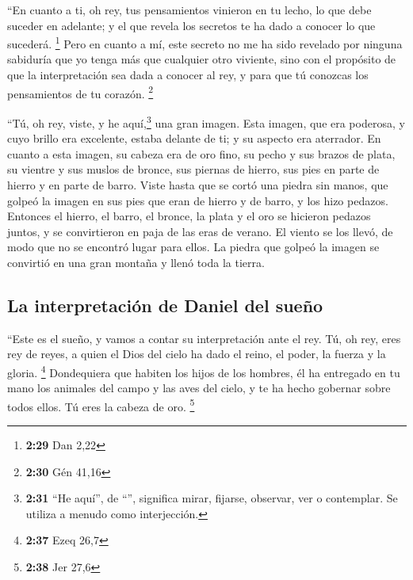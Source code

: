  ``En cuanto a ti, oh rey, tus pensamientos vinieron en
tu lecho, lo que debe suceder en adelante; y el que revela los secretos
te ha dado a conocer lo que sucederá. \footnote{\textbf{2:29} Dan 2,22}
 Pero en cuanto a mí, este secreto no me ha sido revelado
por ninguna sabiduría que yo tenga más que cualquier otro viviente, sino
con el propósito de que la interpretación sea dada a conocer al rey, y
para que tú conozcas los pensamientos de tu corazón. \footnote{\textbf{2:30}
  Gén 41,16}

 ``Tú, oh rey, viste, y he aquí,\footnote{\textbf{2:31}
  ``He aquí'', de ``'', significa mirar, fijarse, observar,
  ver o contemplar. Se utiliza a menudo como interjección.} una gran
imagen. Esta imagen, que era poderosa, y cuyo brillo era excelente,
estaba delante de ti; y su aspecto era aterrador.  En
cuanto a esta imagen, su cabeza era de oro fino, su pecho y sus brazos
de plata, su vientre y sus muslos de bronce,  sus piernas
de hierro, sus pies en parte de hierro y en parte de barro.
 Viste hasta que se cortó una piedra sin manos, que
golpeó la imagen en sus pies que eran de hierro y de barro, y los hizo
pedazos.  Entonces el hierro, el barro, el bronce, la
plata y el oro se hicieron pedazos juntos, y se convirtieron en paja de
las eras de verano. El viento se los llevó, de modo que no se encontró
lugar para ellos. La piedra que golpeó la imagen se convirtió en una
gran montaña y llenó toda la tierra.

\hypertarget{la-interpretaciuxf3n-de-daniel-del-sueuxf1o}{%
\subsection{La interpretación de Daniel del
sueño}\label{la-interpretaciuxf3n-de-daniel-del-sueuxf1o}}

 ``Este es el sueño, y vamos a contar su interpretación
ante el rey.  Tú, oh rey, eres rey de reyes, a quien el
Dios del cielo ha dado el reino, el poder, la fuerza y la gloria.
\footnote{\textbf{2:37} Ezeq 26,7}  Dondequiera que
habiten los hijos de los hombres, él ha entregado en tu mano los
animales del campo y las aves del cielo, y te ha hecho gobernar sobre
todos ellos. Tú eres la cabeza de oro. \footnote{\textbf{2:38} Jer 27,6}

